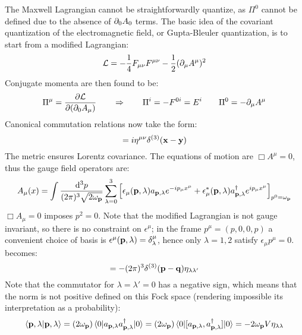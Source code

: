 The Maxwell Lagrangian  cannot be straightforwardly quantize, as $ \Pi^0 $ cannot be defined due to the absence of $ \partial_0 A_0 $ terms. The basic idea of the covariant quantization of the electromagnetic field, or Gupta-Bleuler quantization, is to start from a modified Lagrangian:
\begin{equation}
  \mathcal{L} = - \frac{1}{4} F_{\mu \nu} F^{\mu \nu} - \frac{1}{2} (\partial_\mu A^\mu)^2
\end{equation}
Conjugate momenta are then found to be:
\begin{equation*}
  \Pi^\mu = \frac{\partial \mathcal{L}}{\partial (\partial_0 A_\mu)}
  \qquad \Rightarrow \qquad
  \Pi^i = - F^{0i} = E^i
  \qquad
  \Pi^0 = - \partial_\mu A^\mu
\end{equation*}
Canonical commutation relations now take the form:
\begin{equation}
  [A^\mu(t,\ve{x}) , \Pi^\nu(t,\ve{y})] = i \eta^{\mu \nu} \delta^{(3)}(\ve{x} - \ve{y})
  \label{eq:qed-canon-comm-rel-1}
\end{equation}
The metric ensures Lorentz covariance. The equations of motion are $ \Box A^\mu = 0 $, thus the gauge field operators are:
\begin{equation}
  A_\mu(x) = \int \frac{\mathrm{d}^3p}{(2\pi)^3 \sqrt{2\omega_{\mathbf{p}}}} \sum_{\lambda = 0}^{3} \left[ \epsilon_\mu(\mathbf{p},\lambda) a_{\mathbf{p},\lambda} e^{-i p_\mu x^\mu} + \epsilon_\mu^*(\mathbf{p},\lambda) a_{\mathbf{p},\lambda}^\dagger e^{i p_\mu x^\mu} \right]_{p^0 = \omega_{\mathbf{p}}}
\end{equation}
$ \Box A_\mu = 0 $ imposes $ p^2 = 0 $. Note that the modified Lagrangian is not gauge invariant, so there is no constraint on $ \epsilon^\mu $; in the frame $ p^\mu = (p,0,0,p) $ a convenient choice of basis is $ \epsilon^\mu(\mathbf{p},\lambda) = \delta^\mu_\lambda $, hence only $ \lambda = 1,2 $ satisfy $ \epsilon_\mu p^\mu = 0 $.  becomes:
\begin{equation}
  [a_{\ve{p},\lambda} , a_{\ve{p},\lambda'}\dg] = - (2\pi)^3 \delta^{(3)}(\ve{p} - \ve{q}) \eta_{\lambda \lambda'}
\end{equation}
Note that the commutator for $ \lambda = \lambda' = 0 $ has a negative sign, which means that the norm is not positive defined on this Fock space (rendering impossible its interpretation as a probability):
\begin{equation}
  \braket{\mathbf{p} , \lambda | \mathbf{p} , \lambda} = (2\omega_{\mathbf{p}}) \braket{0 | a_{\mathbf{p},\lambda} a_{\mathbf{p},\lambda}^\dagger | 0} = (2\omega_{\mathbf{p}}) \braket{0 | [a_{\mathbf{p},\lambda} , a_{\mathbf{p},\lambda}^\dagger] | 0} = - 2\omega_{\mathbf{p}} V \eta_{\lambda \lambda}
\end{equation}
